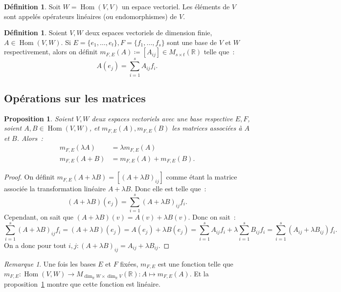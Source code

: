 \documentclass{article}
\DeclareMathOperator{\Hom}{Hom}
\newcommand{\R}{\mathbb R}
\newcommand{\M}[3]{M_{#1 \times #2}(#3)}
\newtheorem{prp}[thm]{Proposition}
\theoremstyle{definition}
\newtheorem{déf}[thm]{Définition}
\theoremstyle{remark}
\newtheorem*{rmq}{Remarque}
\begin{document}
		\begin{déf} Soit $W = \Hom(V, V)$ un espace vectoriel. Les éléments de $V$ sont appelés opérateurs linéaires (ou endomorphismes) de $V$. \end{déf}

		\begin{déf} Soient $V, W$ deux espaces vectoriels de dimension finie, $A \in \Hom(V, W)$. Si $E = \{e_1, \dotsc, e_t\}, F = \{f_1, \dotsc, f_s\}$ sont une
		base de $V$ et $W$ respectivement, alors on définit $m_{F, E}(A) \coloneqq [A_{ij}] \in \M st\R$ telle que~: \[A(e_j) = \sum_{i=1}^sA_{ij}f_i.\] \end{déf}
	
	\subsection{Opérations sur les matrices}
		\begin{prp}\label{linéaritéMatrices} Soient $V, W$ deux espaces vectoriels avec une base respective $E, F$, soient $A, B \in \Hom(V, W)$,
		et $m_{F, E}(A), m_{F, E}(B)$ les matrices associées à $A$ et $B$. Alors~:
		\begin{align*}
			m_{F, E}(\lambda A) &= \lambda m_{F, E}(A) \\
			m_{F, E}(A + B) &= m_{F, E}(A) + m_{F, E}(B).
		\end{align*}
		\end{prp}

		\begin{proof} On définit $m_{F, E}(A + \lambda B) = [(A+ \lambda B)_{ij}]$ comme étant la matrice associée la transformation linéaire $A+\lambda B$. Donc elle est
		telle que~: \[(A+\lambda B)(e_j) = \sum_{i=1}^s(A + \lambda B)_{ij}f_i.\] Cependant, on sait que $(A+\lambda B)(v) = A(v) + \lambda B(v)$. Donc on sait~:
		\[\sum_{i=1}^s(A + \lambda B)_{ij}f_i = (A+\lambda B)(e_j) = A(e_j) + \lambda B(e_j) = \sum_{i=1}^sA_{ij}f_i + \lambda\sum_{i=1}^sB_{ij}f_i
		= \sum_{i=1}^s(A_{ij} + \lambda B_{ij})f_i.\] On a donc pour tout $i, j : (A+\lambda B)_{ij} = A_{ij} + \lambda B_{ij}$. \end{proof}

		\begin{rmq} Une fois les bases $E$ et $F$ fixées, $m_{F, E}$ est une fonction telle que
		$m_{F, E} : \Hom(V, W) \to \M {\dim_\R W}{\dim_\R V}\R : A \mapsto m_{F, E}(A)$.
		Et la proposition~\ref{linéaritéMatrices} montre que cette fonction est linéaire. \end{rmq}
\end{document}
